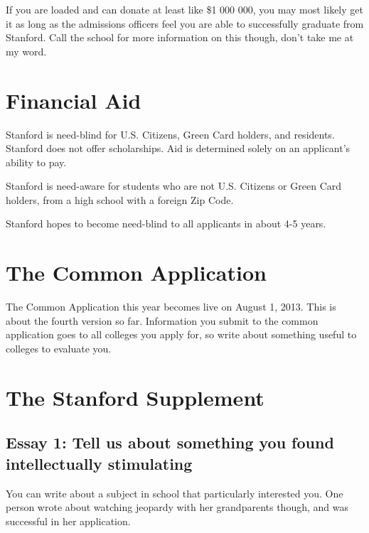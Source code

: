 \documentclass[12pt]{article}
\begin{document}
If you are loaded and can donate at least like \$1 000 000,
you may most likely get it as long as the admissions officers
feel you are able to successfully graduate from Stanford. 
Call the school for more information on this though, don't 
take me at my word. 


\section{Financial Aid}

Stanford is need-blind for U.S. Citizens, Green Card holders,
and residents. Stanford does not offer scholarships.
Aid is determined solely on an applicant's ability to pay. 

Stanford is need-aware for students who are not 
U.S. Citizens or Green Card holders,
from a high school with a foreign Zip Code. 

Stanford hopes to become need-blind to all applicants
in about 4-5 years. 


\section{The Common Application}

The Common Application this year becomes live on August 1, 2013.
This is about the fourth version so far. 
Information you submit to the common application goes to all
colleges you apply for, so write about something useful to
colleges to evaluate you.  


\section{The Stanford Supplement}

\subsection{Essay 1: Tell us about something you found intellectually stimulating}

You can write about a subject in school that particularly interested you.
One person wrote about watching jeopardy with her grandparents though,
and was successful in her application. 
\end{document}
